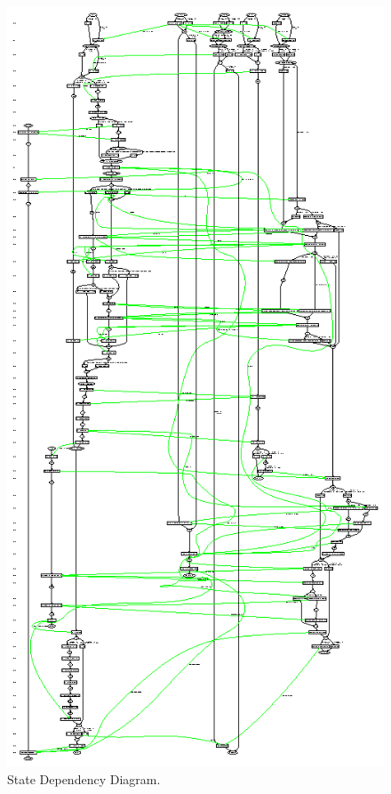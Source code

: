  \begin{figure}[!htb]
 \begin{center}
 \includegraphics*[scale=2.0]{stategraph-labour.ps}
 \caption{State Dependency Diagram.} \label{fig:statelabour}
 \end{center}
 \end{figure}


